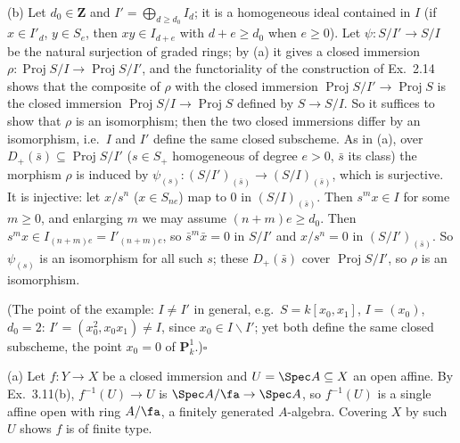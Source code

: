\documentclass[11pt]{article}
\begin{document}
(b) Let $d_0\in\mathbf Z$ and $I'=\bigoplus_{d\ge d_0}I_d$; it is a homogeneous ideal contained in $I$ (if $x\in I'_d$, $y\in S_e$, then $xy\in I_{d+e}$ with $d+e\ge d_0$ when $e\ge0$). Let $\psi:S/I'\to S/I$ be the natural surjection of graded rings; by (a) it gives a closed immersion $\rho:\operatorname{Proj}S/I\to\operatorname{Proj}S/I'$, and the functoriality of the construction of Ex.~2.14 shows that the composite of $\rho$ with the closed immersion $\operatorname{Proj}S/I'\to\operatorname{Proj}S$ is the closed immersion $\operatorname{Proj}S/I\to\operatorname{Proj}S$ defined by $S\to S/I$. So it suffices to show that $\rho$ is an isomorphism; then the two closed immersions differ by an isomorphism, i.e.\ $I$ and $I'$ define the same closed subscheme. As in (a), over $D_+(\bar s)\subseteq\operatorname{Proj}S/I'$ ($s\in S_+$ homogeneous of degree $e>0$, $\bar s$ its class) the morphism $\rho$ is induced by $\psi_{(s)}:(S/I')_{(\bar s)}\to(S/I)_{(\bar s)}$, which is surjective. It is injective: let $x/s^n$ ($x\in S_{ne}$) map to $0$ in $(S/I)_{(\bar s)}$. Then $s^mx\in I$ for some $m\ge0$, and enlarging $m$ we may assume $(n+m)e\ge d_0$. Then $s^mx\in I_{(n+m)e}=I'_{(n+m)e}$, so $\bar s^m\bar x=0$ in $S/I'$ and $x/s^n=0$ in $(S/I')_{(\bar s)}$. So $\psi_{(s)}$ is an isomorphism for all such $s$; these $D_+(\bar s)$ cover $\operatorname{Proj}S/I'$, so $\rho$ is an isomorphism.

(The point of the example: $I\ne I'$ in general, e.g.\ $S=k[x_0,x_1]$, $I=(x_0)$, $d_0=2$: $I'=(x_0^2,x_0x_1)\ne I$, since $x_0\in I\smallsetminus I'$; yet both define the same closed subscheme, the point $x_0=0$ of $\mathbf P^1_k$.)\hfill$\square$

\pf
(a) Let $f:Y\to X$ be a closed immersion and $U=\Spec A\subseteq X$ an open affine. By Ex.~3.11(b), $f^{-1}(U)\to U$ is $\Spec A/\fa\to\Spec A$, so $f^{-1}(U)$ is a single affine open with ring $A/\fa$, a finitely generated $A$-algebra. Covering $X$ by such $U$ shows $f$ is of finite type.
\end{document}
